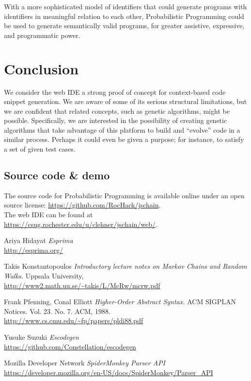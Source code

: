 \documentclass{article}
\begin{document}
With a more sophisticated model of identifiers that could generate programs with
identifiers in meaningful relation to each other, Probabilistic Programming could
be used to generate semantically valid programs, for greater assistive,
expressive, and programmatic power.

\section{Conclusion}

We consider the web IDE a strong proof of concept for context-based code snippet generation. We are aware of some of its serious structural limitations, but we are confident that related concepts, such as genetic algorithms, might be possible. Specifically, we are interested in the possibility of creating genetic algorithms that take advantage of this platform to build and ``evolve'' code in a similar process. Perhaps it could even be given a purpose; for instance, to satisfy a set of given test cases.


\subsection*{Source code \& demo}

The source code for Probabilistic Programming is available online under an open
source license:
\url{https://github.com/RocHack/jschain}.\\

\noindent The web IDE can be found at
\url{https://csug.rochester.edu/u/clehner/jschain/web/}.

\clearpage

\begin{thebibliography}{1}

	 Ariya Hidayat {\em Esprima}
		\\\url{http://esprima.org/}

	 Takis Konstantopoulos {\em Introductory lecture notes on
		Markov Chains and Random Walks.} Uppsala University,
		\\\url{http://www2.math.uu.se/~takis/L/McRw/mcrw.pdf}

	 Frank Pfenning, Conal Elliott
		{\em Higher-Order Abstract Syntax.}
		ACM SIGPLAN Notices. Vol. 23. No. 7. ACM, 1988.
		\\\url{http://www.cs.cmu.edu/~fp/papers/pldi88.pdf}

	 Yusuke Suzuki {\em Escodegen}
		\\\url{https://github.com/Constellation/escodegen}

	 Mozilla Developer Network {\em SpiderMonkey Parser API}
		\\\url{https://developer.mozilla.org/en-US/docs/SpiderMonkey/Parser_API}

\end{thebibliography}
\end{document}
